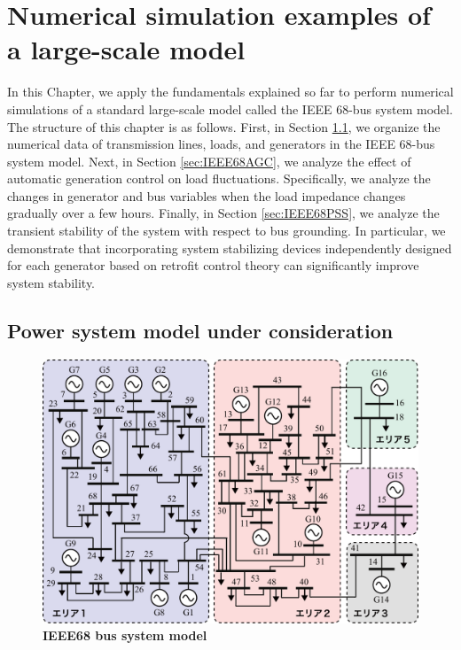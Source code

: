 \documentclass[graybox, envcountchap]{svmult}
\begin{document}
\chapter{Numerical simulation examples of a large-scale model}\label{chap:largesim}

In this Chapter, we apply the fundamentals explained so far to perform numerical
simulations of a standard large-scale model called the IEEE 68-bus system model.
The structure of this chapter is as follows. First, in Section \ref{sec:IEEE68},
we organize the numerical data of transmission lines, loads, and generators in
the IEEE 68-bus system model. Next, in Section \ref{sec:IEEE68AGC}, we analyze
the effect of automatic generation control on load fluctuations. Specifically,
we analyze the changes in generator and bus variables when the load impedance
changes gradually over a few hours. Finally, in Section \ref{sec:IEEE68PSS}, we
analyze the transient stability of the system with respect to bus grounding. In
particular, we demonstrate that incorporating system stabilizing devices
independently designed for each generator based on retrofit control theory can
significantly improve system stability.

\section{Power system model under consideration}\label{sec:IEEE68}

\begin{figure}[t]
\centering
\includegraphics[width = .99\linewidth]{figs/IEEE68bus}
\medskip
\caption{\textbf{IEEE68 bus system model}}
\label{fig:IEEE68bus}
\medskip
\end{figure}
\end{document}
